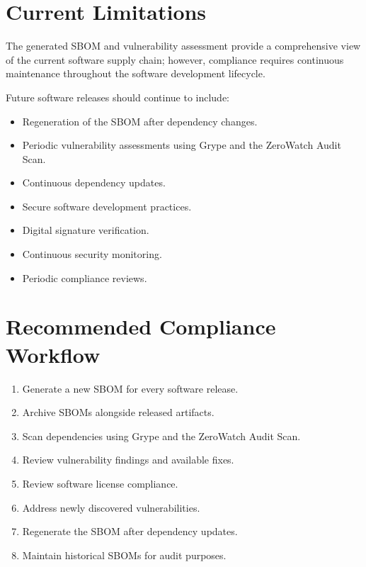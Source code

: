 \vspace{0.4cm}


\section{Current Limitations}

The generated SBOM and vulnerability assessment provide a comprehensive view of the current software supply chain; however, compliance requires continuous maintenance throughout the software development lifecycle.

Future software releases should continue to include:
\begin{itemize}
\item Regeneration of the SBOM after dependency changes.
\item Periodic vulnerability assessments using Grype and the ZeroWatch Audit Scan.
\item Continuous dependency updates.
\item Secure software development practices.
\item Digital signature verification.
\item Continuous security monitoring.
\item Periodic compliance reviews.
\end{itemize}

\vspace{0.4cm}


\section{Recommended Compliance Workflow}

\begin{enumerate}
\item Generate a new SBOM for every software release.
\item Archive SBOMs alongside released artifacts.
\item Scan dependencies using Grype and the ZeroWatch Audit Scan.
\item Review vulnerability findings and available fixes.
\item Review software license compliance.
\item Address newly discovered vulnerabilities.
\item Regenerate the SBOM after dependency updates.
\item Maintain historical SBOMs for audit purposes.
\end{enumerate}

